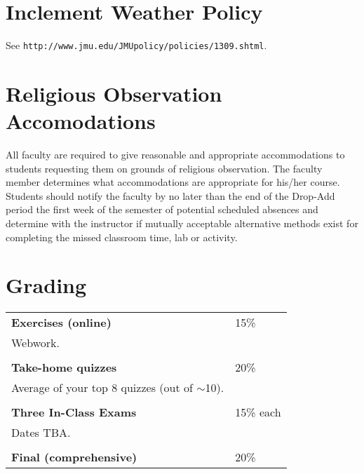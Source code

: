 \documentclass[margin,line,pifont,palatino,courier]{res}
\begin{document}
\begin{resume}
\section{\sc Inclement Weather Policy} See \verb+http://www.jmu.edu/JMUpolicy/policies/1309.shtml+. %

\vspace{0.5pc}
\section{\sc Religious Observation \\ Accomodations} All faculty are required to give reasonable and appropriate accommodations to students requesting them on grounds of religious observation. The faculty member determines what accommodations are appropriate for his/her course. Students should notify the faculty by no later than the end of the Drop-Add period the first week of the semester of potential scheduled absences and determine with the instructor if mutually acceptable alternative methods exist for completing the missed classroom time, lab or activity.


\section{\sc Grading} 
\begin{supertabular}{@{}p{0.6\textwidth} l}
	{\bf Exercises (online)} & 15\% \\
		Webwork. & \\
		 & \\
{\bf Take-home quizzes} & 20\% \\
	Average of your top 8 quizzes (out of $\sim$10). & \\
 & \\
 {\bf Three In-Class Exams} & 15\% each \\
 Dates TBA. & \\
& \\
{\bf Final (comprehensive)} & 20\% \\
\end{supertabular}


\end{resume}
\end{document}
